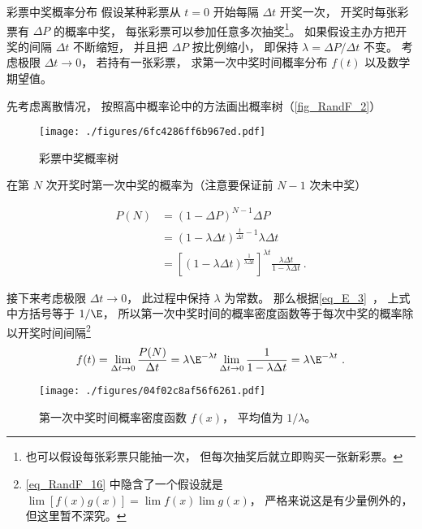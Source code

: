\begin{example}{彩票中奖概率分布}
假设某种彩票从 $t = 0$ 开始每隔 $\Delta t$ 开奖一次， 开奖时每张彩票有 $\Delta P$ 的概率中奖， 每张彩票可以参加任意多次抽奖\footnote{也可以假设每张彩票只能抽一次， 但每次抽奖后就立即购买一张新彩票。}。 如果假设主办方把开奖的间隔 $\Delta t$ 不断缩短， 并且把 $\Delta P$ 按比例缩小， 即保持 $\lambda = {\Delta P}/{\Delta t}$ 不变。 考虑极限 $\Delta t\to 0$， 若持有一张彩票， 求第一次中奖时间概率分布 $f(t)$ 以及数学期望值。

先考虑离散情况， 按照高中概率论中的方法画出概率树（\autoref{fig_RandF_2}）
\begin{figure}[ht]
\centering
\texttt{[image: ./figures/6fc4286ff6b967ed.pdf]}
\caption{彩票中奖概率树} \label{fig_RandF_2}
\end{figure}
在第 $N$ 次开奖时第一次中奖的概率为（注意要保证前 $N-1$ 次未中奖）

\begin{equation}
\begin{aligned}
P(N) &= (1-\Delta P)^{N-1} \Delta P\\
&= (1-\lambda\Delta t)^{\frac{t}{\Delta t}-1} \lambda\Delta t\\
&= [(1-\lambda\Delta t)^{\frac{1}{\lambda\Delta t}}]^{\lambda t} \frac{\lambda\Delta t}{1-\lambda\Delta t}~.
\end{aligned}
\end{equation}

接下来考虑极限 $\Delta t\to 0$， 此过程中保持 $\lambda$ 为常数。 那么根据\autoref{eq_E_3}~， 上式中方括号等于 $1/\E$， 所以第一次中奖时间的概率密度函数等于每次中奖的概率除以开奖时间间隔\footnote{\autoref{eq_RandF_16} 中隐含了一个假设就是 $\lim [f(x)g(x)] = \lim f(x) \lim g(x)$， 严格来说这是有少量例外的， 但这里暂不深究。} %
\begin{equation}\label{eq_RandF_16}
f(t) = \lim_{\Delta t\to 0} \frac{P(N)}{\Delta t} = \lambda\E^{-\lambda t}\lim_{\Delta t\to 0} \frac{1}{1-\lambda\Delta t} = \lambda\E^{-\lambda t}~.
\end{equation}


\begin{figure}[ht]
\centering
\texttt{[image: ./figures/04f02c8af56f6261.pdf]}
\caption{第一次中奖时间概率密度函数 $f(x)$， 平均值为 $1/\lambda$。} \label{fig_RandF_3}
\end{figure}


\end{example}
